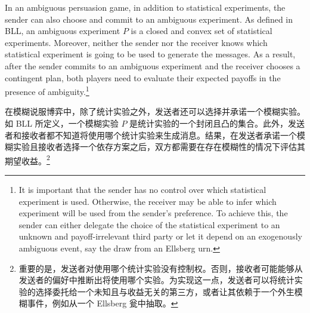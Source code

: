 \documentclass[12pt,a4paper]{article}
\theoremstyle{definition}
\theoremstyle{remark}
\newenvironment{original}{%
    \par\medskip\noindent%
    \begin{tcolorbox}[%
        colback=white,%
        colframe=black!50,%
        title=\textbf{Original English},%
        fonttitle=\small\bfseries,%
        left=0pt, right=0pt, top=2pt, bottom=2pt,%
        boxrule=0.5pt,%
        arc=0pt,%
        outer arc=0pt%
    ]%
    \small%
}{%
    \end{tcolorbox}%
}
\newenvironment{translation}{%
    \par\smallskip\noindent%
    \begin{tcolorbox}[%
        colback=blue!3!white,%
        colframe=blue!40!black,%
        title=\textbf{中文翻译},%
        fonttitle=\small\bfseries,%
        left=0pt, right=0pt, top=2pt, bottom=2pt,%
        boxrule=0.5pt,%
        arc=0pt,%
        outer arc=0pt%
    ]%
    \small\color{blue!60!black}%
}{%
    \end{tcolorbox}\medskip%
}
\begin{document}
\begin{original}
In an ambiguous persuasion game, in addition to statistical experiments, the sender can also choose and commit to an ambiguous experiment. As defined in BLL, an ambiguous experiment $P$ is a closed and convex set of statistical experiments. Moreover, neither the sender nor the receiver knows which statistical experiment is going to be used to generate the messages. As a result, after the sender commits to an ambiguous experiment and the receiver chooses a contingent plan, both players need to evaluate their expected payoffs in the presence of ambiguity.\footnote{It is important that the sender has no control over which statistical experiment is used. Otherwise, the receiver may be able to infer which experiment will be used from the sender's preference. To achieve this, the sender can either delegate the choice of the statistical experiment to an unknown and payoff-irrelevant third party or let it depend on an exogenously ambiguous event, say the draw from an Ellsberg urn.}
\end{original}
\begin{translation}
在模糊说服博弈中，除了统计实验之外，发送者还可以选择并承诺一个模糊实验。如 BLL 所定义，一个模糊实验 $P$ 是统计实验的一个封闭且凸的集合。此外，发送者和接收者都不知道将使用哪个统计实验来生成消息。结果，在发送者承诺一个模糊实验且接收者选择一个依存方案之后，双方都需要在存在模糊性的情况下评估其期望收益。\footnote{重要的是，发送者对使用哪个统计实验没有控制权。否则，接收者可能能够从发送者的偏好中推断出将使用哪个实验。为实现这一点，发送者可以将统计实验的选择委托给一个未知且与收益无关的第三方，或者让其依赖于一个外生模糊事件，例如从一个 Ellsberg 瓮中抽取。}
\end{translation}
\end{document}
